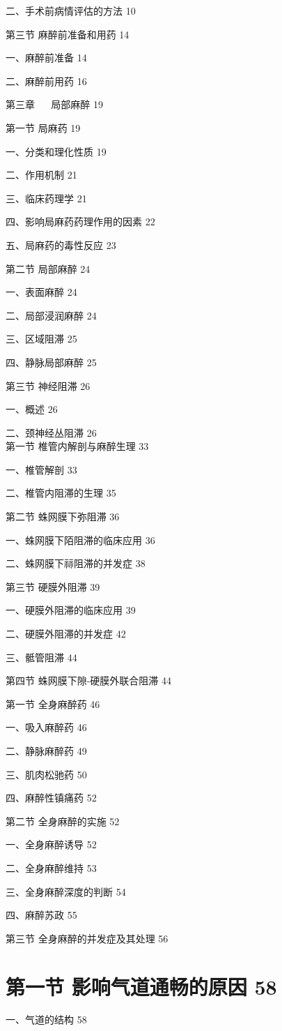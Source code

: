 \documentclass[10pt]{article}
\begin{document}
二、手术前病情评估的方法 10

第三节 麻醉前准备和用药 14

一、麻醉前准备 14

二、麻醉前用药 16

第三章 $\quad$ 局部麻醉 19

第一节 局麻药 19

一、分类和理化性质 19

二、作用机制 21

三、临床药理学 21

四、影响局麻药药理作用的因素 22

五、局麻药的毒性反应 23

第二节 局部麻醉 24

一、表面麻醉 24

二、局部浸润麻醉 24

三、区域阻滞 25

四、静脉局部麻醉 25

第三节 神经阻滞 26

一、概述 26

二、颈神经丛阻滞 26\\
第一节 椎管内解剖与麻醉生理 33

一、椎管解剖 33

二、椎管内阻滞的生理 35

第二节 蛛网膜下弥阻滞 36

一、蛛网膜下陌阻滞的临床应用 36

二、蛛网膜下祘阻滞的并发症 38

第三节 硬膜外阻滞 39

一、硬膜外阻滞的临床应用 39

二、硬膜外阻滞的并发症 42

三、骶管阻滞 44

第四节 蛛网膜下隙-硬膜外联合阻滞 44

第一节 全身麻醉药 46

一、吸入麻醉药 46

二、静脉麻醉药 49

三、肌肉松驰药 50

四、麻醉性镇痛药 52

第二节 全身麻醉的实施 52

一、全身麻醉诱导 52

二、全身麻醉维持 53

三、全身麻醉深度的判断 54

四、麻醉苏政 55

第三节 全身麻醉的并发症及其处理 56

\section*{第一节 影响气道通畅的原因 58}
一、气道的结构 58
\end{document}
